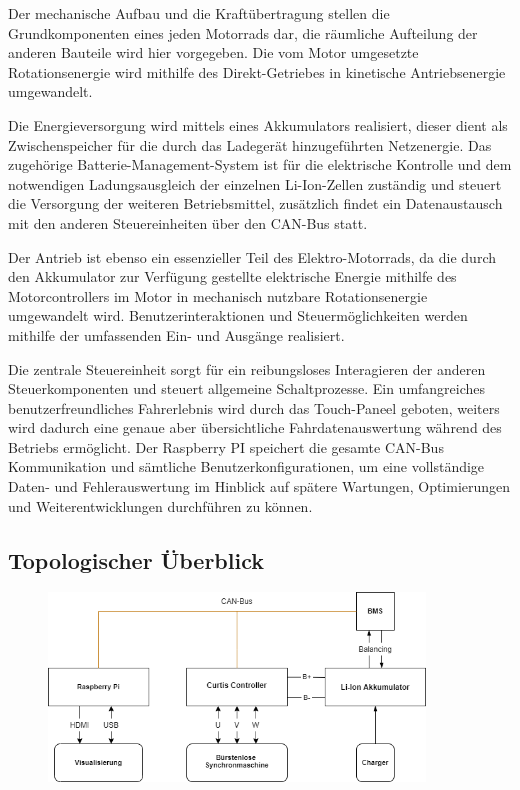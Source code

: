 Der mechanische Aufbau und die Kraftübertragung stellen die Grundkomponenten eines jeden Motorrads dar, die räumliche Aufteilung der anderen Bauteile wird hier vorgegeben. Die vom Motor umgesetzte Rotationsenergie wird mithilfe des Direkt-Getriebes in kinetische Antriebsenergie umgewandelt.

Die Energieversorgung wird mittels eines Akkumulators realisiert, dieser dient als Zwischenspeicher für die durch das Ladegerät hinzugeführten Netzenergie. Das zugehörige Batterie-Management-System ist für die elektrische Kontrolle und dem notwendigen Ladungsausgleich der einzelnen Li-Ion-Zellen zuständig und steuert die Versorgung der weiteren Betriebsmittel, zusätzlich findet ein Datenaustausch mit den anderen Steuereinheiten über den CAN-Bus statt.

Der Antrieb ist ebenso ein essenzieller Teil des Elektro-Motorrads, da die durch den Akkumulator zur Verfügung gestellte elektrische Energie mithilfe des Motorcontrollers im Motor in mechanisch nutzbare Rotationsenergie umgewandelt wird. Benutzerinteraktionen und Steuermöglichkeiten werden mithilfe der umfassenden Ein- und Ausgänge realisiert.

Die zentrale Steuereinheit sorgt für ein reibungsloses Interagieren der anderen Steuerkomponenten und steuert allgemeine Schaltprozesse. Ein umfangreiches benutzerfreundliches Fahrerlebnis wird durch das Touch-Paneel geboten, weiters wird dadurch eine genaue aber übersichtliche Fahrdatenauswertung während des Betriebs ermöglicht. Der Raspberry PI speichert die gesamte CAN-Bus Kommunikation und sämtliche Benutzerkonfigurationen, um eine vollständige Daten- und Fehlerauswertung im Hinblick auf spätere Wartungen, Optimierungen und Weiterentwicklungen durchführen zu können.

\newpage

\subsection{Topologischer Überblick}

\begin{figure} [H]
	\begin{center}
		\includegraphics[width=10cm] {figures/allgemein/konzept_simple.png}
	\end{center}
\end{figure}


